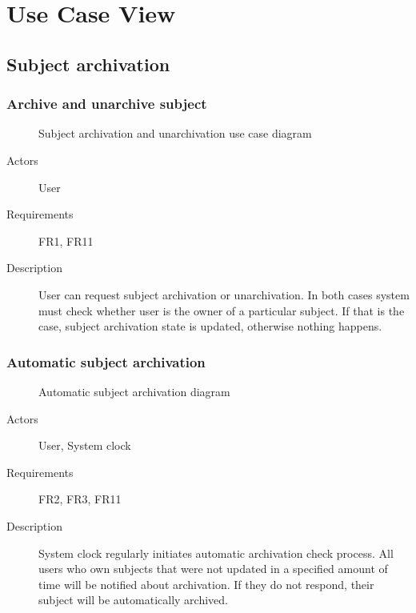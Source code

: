 \documentclass[
    english, %
]{VUMIFPSkursinis}
\begin{document}
\section{Use Case View}

\subsection{Subject archivation}

\subsubsection{Archive and unarchive subject}

\begin{figure}[ht]
    \centering
    
    \label{archivation-use-case}
    \caption{Subject archivation and unarchivation use case diagram}
\end{figure}

\begin{description}
    \item[Actors] User
    \item[Requirements] FR1, FR11
    \item[Description] User can request subject archivation or unarchivation. In both cases system must check whether user is the owner of a particular subject. If that is the case, subject archivation state is updated, otherwise nothing happens.
\end{description}

\subsubsection{Automatic subject archivation}

\begin{figure}[ht]
    \centering
    
    \label{automatic-archivation-use-case}
    \caption{Automatic subject archivation diagram}
\end{figure}

\begin{description}
    \item[Actors] User, System clock
    \item[Requirements] FR2, FR3, FR11
    \item[Description] System clock regularly initiates automatic archivation check process. All users who own subjects that were not updated in a specified amount of time will be notified about archivation. If they do not respond, their subject will be automatically archived.
\end{description}
\end{document}
